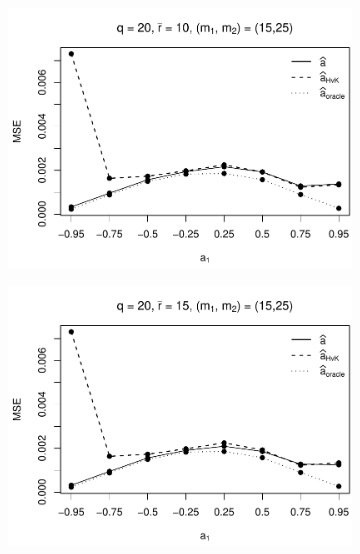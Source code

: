 \begin{figure}[h!]
\begin{subfigure}[b]{0.45\textwidth}
\includegraphics[width=\textwidth]{Plots/Robustness/MSE_a1_T=500_slope=1_(q,r,M1,M2)=(20,10,15,25).pdf}
\end{subfigure}
\hspace{0.25cm}
\begin{subfigure}[b]{0.45\textwidth}
\includegraphics[width=\textwidth]{Plots/Robustness/MSE_a1_T=500_slope=1_(q,r,M1,M2)=(20,15,15,25).pdf}
\end{subfigure}


\end{figure}
